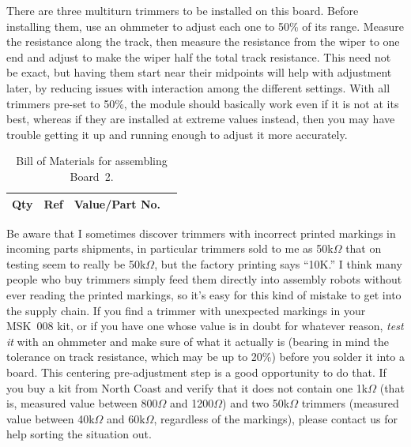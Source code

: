 There are three multiturn trimmers to be installed on this board.  Before
installing them, use an ohmmeter to adjust each one to 50\% of its range. 
Measure the resistance along the track, then measure the resistance from the
wiper to one end and adjust to make the wiper half the total track
resistance.  This need not be exact, but having them start near their
midpoints will help with adjustment later,
by reducing issues with interaction among the different settings.  With all
trimmers pre-set to 50\%, the module should basically work even if it is not
at its best, whereas if they are installed at extreme values instead, then
you may have trouble getting it up and running enough to adjust it more
accurately.

\begin{table}
{\centering
{}
\vspace{\baselineskip}

\begin{tabular}{rp{1.3in}cp{3in}}
  \textbf{Qty} & \textbf{Ref} & \textbf{Value/Part No.} & \\ \hline

\end{tabular}\par}
\caption{Bill of Materials for assembling Board~2.}\label{tab:b2bom}
\end{table}

Be aware that I sometimes discover trimmers with incorrect printed markings
in incoming parts shipments, in particular trimmers sold to me as
50k$\Omega$ that on testing seem to really be 50k$\Omega$, but the factory
printing says ``10K.'' I think many people who buy trimmers simply feed them
directly into assembly robots without ever reading the printed markings, so
it's easy for this kind of mistake to get into the supply chain.  If you
find a trimmer with unexpected markings in your MSK~008 kit, or if you have
one whose value is in doubt for whatever reason, \emph{test it} with an
ohmmeter and make sure of what it actually is (bearing in mind the tolerance
on track resistance, which may be up to 20\%) before you solder it into a
board.  This centering pre-adjustment step is a good opportunity to do that. 
If you buy a kit from North Coast and verify that it does not contain one
1k$\Omega$ (that is, measured value between 800$\Omega$ and 1200$\Omega$)
and two 50k$\Omega$ trimmers (measured value between 40k$\Omega$ and
60k$\Omega$, regardless of the markings), please contact us for help sorting
the situation out.


